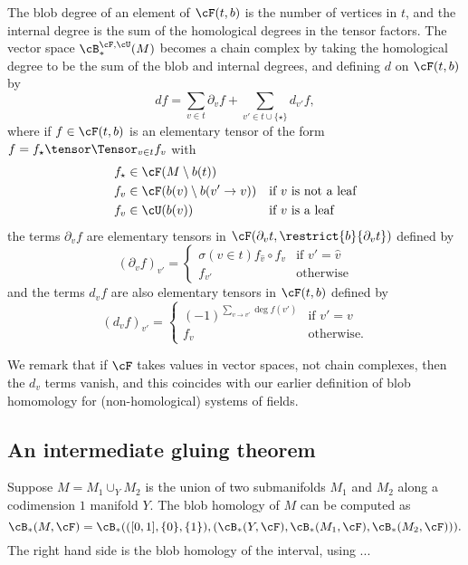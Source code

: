 The blob degree of an element of $\cF(t,b)$ is the number of vertices in $t$, and the internal degree is the sum of the homological degrees in the tensor factors.
The vector space $\cB_*^{\cF,\cU}(M)$ becomes a chain complex by taking the homological degree to be the sum of the blob and internal degrees, and defining $d$ on $\cF(t,b)$ by
\begin{equation*}
d f = \sum_{v \in t} \partial_v f + \sum_{v' \in t \cup \{\star\}} d_{v'} f,
\end{equation*}
where if $f \in \cF(t,b)$ is an elementary tensor of the form $f = f_\star \tensor \Tensor_{v \in t} f_v$ with
\begin{align*}
f_\star & \in \cF(M \setminus b(t)) && \\
f_v       & \in \cF(b(v) \setminus b(v' \to v)) && \text{if $v$ is not a leaf} \\
f_v       & \in \cU(b(v)) && \text{if $v$ is a leaf}
\end{align*}
the terms $\partial_v f$ are elementary tensors in $\cF(\partial_v t, \restrict{b}{\partial_v t})$ defined by
\begin{equation*}
(\partial_v f)_{v'} = \begin{cases} \sigma(v \in t) f_{\hat{v}} \circ f_v & \text{if $v' = \hat{v}$} \\ f_{v'} & \text{otherwise} \end{cases}
\end{equation*}
and the terms $d_v f$ are also elementary tensors in $\cF(t, b)$ defined by
\begin{equation*}
(d_v f)_{v'} = \begin{cases} (-1)^{\sum_{v \to v'} \deg f(v')} & \text{if $v'=v$} \\ f_v & \text{otherwise.} \end{cases}
\end{equation*}

We remark that if $\cF$ takes values in vector spaces, not chain complexes, then the $d_v$ terms vanish, and this coincides with our earlier definition of blob homomology for (non-homological) systems of fields.



\subsection{An intermediate gluing theorem}

\begin{thm}
Suppose $M = M_1 \cup_Y M_2$ is the union of two submanifolds $M_1$ and $M_2$ along a codimension $1$ manifold $Y$. The blob homology of $M$ can be computed as
\begin{equation*}
\cB_*(M, \cF) = \cB_*(([0,1], \{0\}, \{1\}), (\cB_*(Y, \cF), \cB_*(M_1, \cF), \cB_*(M_2, \cF))).
\end{equation*}
The right hand side is the blob homology of the interval, using ...
\end{thm}